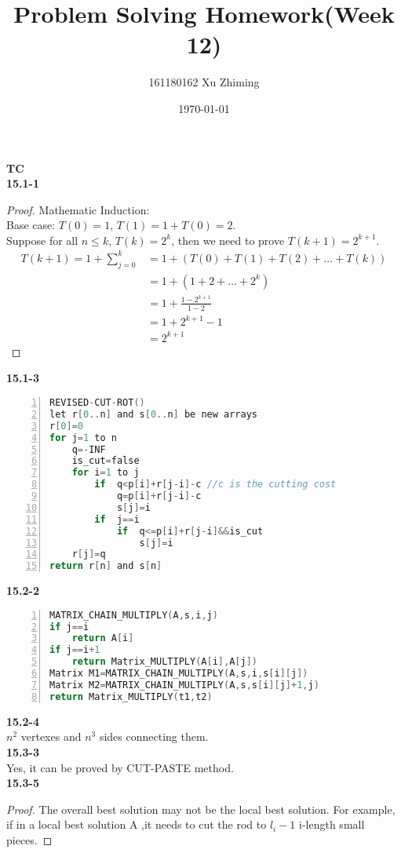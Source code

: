 \documentclass{article}
\begin{document}
\title{Problem Solving Homework(Week 12)}{\author{161180162 Xu Zhiming}\date{\today}\maketitle
\setlength\parindent{0em}\large\textbf{TC}\\
\normalsize
\textbf{15.1-1}
\begin{proof}
Mathematic Induction:\\
Base case: $T(0)=1$, $T(1)=1+T(0)=2$.\\
Suppose for all $n\leq k$, $T(k)=2^k$, then we need to prove $T(k+1)=2^{k+1}$.\\
\begin{equation*}
\begin{aligned}
T(k+1)=1+\sum_{j=0}^{k}&=1+(T(0)+T(1)+T(2)+\dots+T(k))\\
&=1+(1+2+\dots+2^k)\\&=1+\frac{1-2^{k+1}}{1-2}\\&=1+2^{k+1}-1\\&=2^{k+1}
\end{aligned}
\end{equation*}
\end{proof}
\textbf{15.1-3}
\begin{lstlisting}[language=C,numbers=left]
REVISED-CUT-ROT()
let r[0..n] and s[0..n] be new arrays
r[0]=0
for j=1 to n
	q=-INF
	is_cut=false
	for i=1 to j
		if  q<p[i]+r[j-i]-c	//c is the cutting cost
			q=p[i]+r[j-i]-c
			s[j]=i
		if  j==i
			if	q<=p[i]+r[j-i]&&is_cut
				s[j]=i
	r[j]=q
return r[n] and s[n]
\end{lstlisting}
\textbf{15.2-2}
\begin{lstlisting}[language=C,numbers=left]
MATRIX_CHAIN_MULTIPLY(A,s,i,j)  
if j==i  
	return A[i]
if j==i+1
	return Matrix_MULTIPLY(A[i],A[j])
Matrix M1=MATRIX_CHAIN_MULTIPLY(A,s,i,s[i][j]) 
Matrix M2=MATRIX_CHAIN_MULTIPLY(A,s,s[i][j]+1,j)   
return Matrix_MULTIPLY(t1,t2)
\end{lstlisting}
\textbf{15.2-4}\\
$n^2$ vertexes and $n^3$ sides connecting them.\\
\textbf{15.3-3}\\
Yes, it can be proved by CUT-PASTE method.\\
\textbf{15.3-5}
\begin{proof}
The overall best solution may not be the local best solution. 
For example, if in a local best solution A ,it needs to cut the rod to $l_i-1$ i-length small pieces.

\end{proof}}
\end{document}
